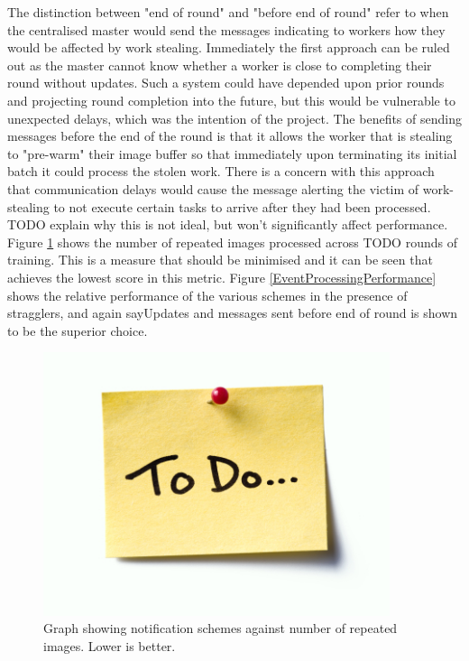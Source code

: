\documentclass[12pt]{article}
\begin{document}
The distinction between "end of round" and "before end of round" refer to when the centralised master would send the messages indicating to workers how they would be affected by work stealing. Immediately the first approach can be ruled out as the master cannot know whether a worker is close to completing their round without updates. Such a system could have depended upon prior rounds and projecting round completion into the future, but this would be vulnerable to unexpected delays, which was the intention of the project.
\newline
The benefits of sending messages before the end of the round is that it allows the worker that is stealing to "pre-warm" their image buffer so that immediately upon terminating its initial batch it could process the stolen work. There is a concern with this approach that communication delays would cause the message alerting the victim of work-stealing to not execute certain tasks to arrive after they had been processed. TODO explain why this is not ideal, but won't significantly affect performance.
\newline
Figure \ref{RepeatedEvents} shows the number of repeated images processed across TODO rounds of training. This is a measure that should be minimised and it can be seen that  achieves the lowest score in this metric. Figure \ref{EventProcessingPerformance} shows the relative performance of the various schemes in the presence of stragglers, and again say{Updates and messages sent before end of round} is shown to be the superior choice.
\newline

\begin{figure}[H]
  \centering
  \includegraphics[width=4in]{todo}
  \caption[]{Graph showing notification schemes against number of repeated images. Lower is better.}
  \label{RepeatedEvents}
\end{figure}
\end{document}
